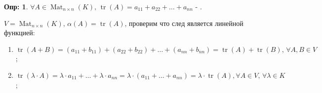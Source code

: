 \documentclass[12pt]{article}
\theoremstyle{definition}
\newtheorem{defn}{Опр:}
\newcommand{\mat}[2]{\operatorname{Mat}_{#1\times #2}}
\DeclareMathOperator*{\tr}{tr}
\begin{document}
\begin{defn}
	$\forall A \in \mat{n}{n}(K), \, \tr{(A)} = a_{11} + a_{22} + \dotsc + a_{nn}$ - .
\end{defn}

$V = \mat{n}{n}(K), \, \alpha(A) = \tr{(A)}$, проверим что след является линейной функцией:
\begin{enumerate}[label=(\arabic*)]
	\item $\tr{(A+B)} = (a_{11} + b_{11}) + (a_{22} + b_{22}) + \dotsc + (a_{nn} + b_{nn}) = \tr{(A)} + \tr{(B)} , \, \forall A,B \in V$;
	\item $\tr(\lambda{\cdot}A) = \lambda{\cdot}a_{11} + \dotsc + \lambda{\cdot}a_{nn} = \lambda{\cdot}(a_{11} + \dotsc + a_{nn}) = \lambda{\cdot}\tr{(A)}, \forall A \in V, \, \forall \lambda \in K$;
\end{enumerate}
\end{document}
